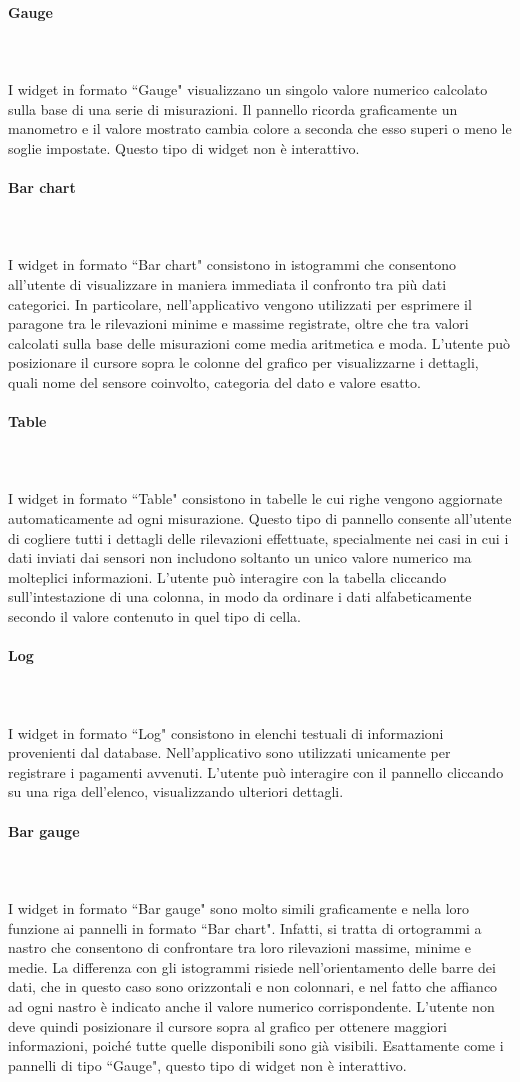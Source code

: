 \documentclass[8pt]{article}
\newcommand{\subsubsubsection}[1]{\paragraph{#1}\mbox{}\\\\}
\begin{document}
\subsubsubsection{Gauge}
I widget in formato ``Gauge" visualizzano un singolo valore numerico calcolato sulla base di una serie di misurazioni. Il pannello ricorda graficamente un manometro e il valore mostrato cambia colore a seconda che esso superi o meno le soglie impostate. Questo tipo di widget non è interattivo.

\subsubsubsection{Bar chart}
I widget in formato ``Bar chart" consistono in istogrammi che consentono all'utente di visualizzare in maniera immediata il confronto tra più dati categorici. In particolare, nell'applicativo vengono utilizzati per esprimere il paragone tra le rilevazioni minime e massime registrate, oltre che tra valori calcolati sulla base delle misurazioni come media aritmetica e moda. L'utente può posizionare il cursore sopra le colonne del grafico per visualizzarne i dettagli, quali nome del sensore coinvolto, categoria del dato e valore esatto.

\subsubsubsection{Table}
I widget in formato ``Table" consistono in tabelle le cui righe vengono aggiornate automaticamente ad ogni misurazione. Questo tipo di pannello consente all'utente di cogliere tutti i dettagli delle rilevazioni effettuate, specialmente nei casi in cui i dati inviati dai sensori non includono soltanto un unico valore numerico ma molteplici informazioni. L'utente può interagire con la tabella cliccando sull'intestazione di una colonna, in modo da ordinare i dati alfabeticamente secondo il valore contenuto in quel tipo di cella.

\subsubsubsection{Log}
I widget in formato ``Log" consistono in elenchi testuali di informazioni provenienti dal database. Nell'applicativo sono utilizzati unicamente per registrare i pagamenti avvenuti. L'utente può interagire con il pannello cliccando su una riga dell'elenco, visualizzando ulteriori dettagli.

\subsubsubsection{Bar gauge}
I widget in formato ``Bar gauge" sono molto simili graficamente e nella loro funzione ai pannelli in formato ``Bar chart". Infatti, si tratta di ortogrammi a nastro che consentono di confrontare tra loro rilevazioni massime, minime e medie. La differenza con gli istogrammi risiede nell'orientamento delle barre dei dati, che in questo caso sono orizzontali e non colonnari, e nel fatto che affianco ad ogni nastro è indicato anche il valore numerico corrispondente. L'utente non deve quindi posizionare il cursore sopra al grafico per ottenere maggiori informazioni, poiché tutte quelle disponibili sono già visibili. Esattamente come i pannelli di tipo ``Gauge", questo tipo di widget non è interattivo.
\end{document}
